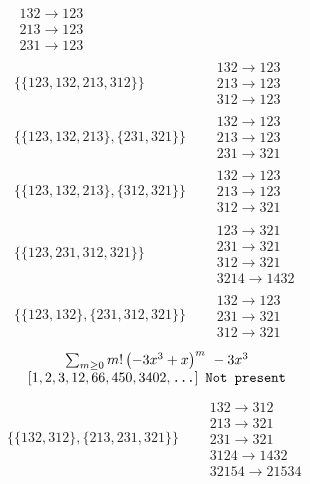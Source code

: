 \begin{tiny}
\begin{align}
\begin{matrix}
132 \to 123\\213 \to 123\\231 \to 123
\end{matrix}
\\
\{\{123, 132, 213, 312\}\}
\quad
&
\begin{matrix}
132 \to 123\\213 \to 123\\312 \to 123
\end{matrix}
\\
\{\{123, 132, 213\}, \{231, 321\}\}
\quad
&
\begin{matrix}
132 \to 123\\213 \to 123\\231 \to 321
\end{matrix}
\\
\{\{123, 132, 213\}, \{312, 321\}\}
\quad
&
\begin{matrix}
132 \to 123\\213 \to 123\\312 \to 321
\end{matrix}
\\
\{\{123, 231, 312, 321\}\}
\quad
&
\begin{matrix}
123 \to 321\\231 \to 321\\312 \to 321\\3214 \to 1432
\end{matrix}
\\
\{\{123, 132\}, \{231, 312, 321\}\}
\quad
&
\begin{matrix}
132 \to 123\\231 \to 321\\312 \to 321
\end{matrix}
\end{align}
$$
\begin{matrix}
\sum_{m \geq 0} m! \left(
-3 x^{3} + x
\right)^m
\ 
-3 x^{3}
\\
\left[1, 2, 3, 12, 66, 450, 3402, \text{\texttt{...}}\right]
\ 
\texttt{Not present}
\end{matrix}
$$
\vspace{-1em}
\begin{align}
\{\{132, 312\}, \{213, 231, 321\}\}
\quad
&
\begin{matrix}
132 \to 312\\213 \to 321\\231 \to 321\\3124 \to 1432\\32154 \to 21534
\end{matrix}

\end{align}
\end{tiny}
